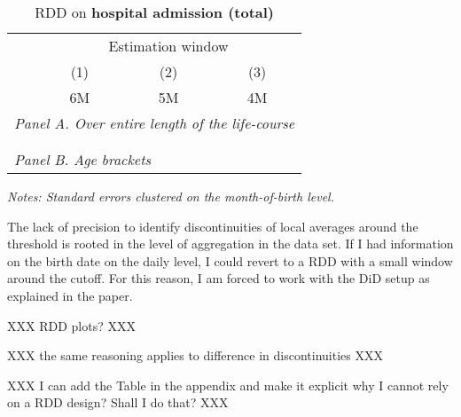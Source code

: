 \begin{table}[H] \centering 
	\begin{threeparttable} \centering \caption{RDD on \textbf{hospital admission (total)}}\label{tab_mlch: revision_RDD_hopsital2_total}
		{\def\sym#1{\ifmmode^{#1}\else\(^{#1}\)\fi} 
			\begin{tabular}{l*{3}{c}}
				\toprule 
				& \multicolumn{3}{c}{Estimation window} \\ 
				\cmidrule(lr){2-4}
				&\multicolumn{1}{c}{(1)}&\multicolumn{1}{c}{(2)}&\multicolumn{1}{c}{(3)}\\
				&\multicolumn{1}{c}{6M}&\multicolumn{1}{c}{5M}&\multicolumn{1}{c}{4M}\\
				\midrule
				\multicolumn{4}{l}{\emph{Panel A. Over entire length of the life-course}} \\
				 \\ \\
				\multicolumn{4}{l}{\emph{Panel B. Age brackets}} \\
				    
				\bottomrule 
		\end{tabular}}
		\begin{tablenotes} 
			\item \scriptsize \emph{Notes: Standard errors clustered on the month-of-birth level.} 
		\end{tablenotes} 
	\end{threeparttable} 
\end{table}

The lack of precision to identify discontinuities of local averages around the threshold is rooted in the level of aggregation in the data set. If I had information on the birth date on the daily level, I could revert to a RDD with a small window around the cutoff. For this reason, I am forced to work with the DiD setup as explained in the paper.  


XXX RDD plots? XXX

XXX  the same reasoning applies to difference in discontinuities XXX
 
XXX I can add the Table in the appendix and make it explicit why I cannot rely on a RDD design?  Shall I do that? XXX


